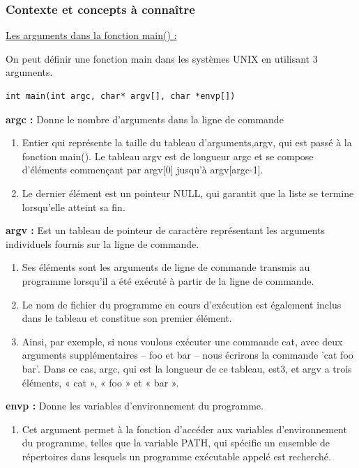\documentclass[12pt,a4paper]{article}
\begin{document}
\begin{flushleft}
            \subsubsection{Contexte et concepts à connaître}
            \underline{Les arguments dans la fonction main() : }
                \item On peut définir une fonction main dans les systèmes UNIX en utilisant 3 arguments.
                \begin{lstlisting}
int main(int argc, char* argv[], char *envp[])
                \end{lstlisting}
                \item \textbf{argc : } Donne le nombre d'arguments dans la ligne de commande
                \begin{enumerate}
                    \item Entier qui représente la taille du tableau d’arguments,argv, qui est passé à la fonction main(). Le tableau argv est de longueur argc et se compose d’éléments commençant par argv[0] jusqu’à argv[argc-1].
                    \item Le dernier élément est un pointeur NULL, qui garantit que la liste se termine lorsqu’elle atteint sa fin.
                \end{enumerate}
                \item \textbf{argv : } Est un tableau de pointeur de caractère représentant les arguments individuels fournis sur la ligne de commande.
                 \begin{enumerate}
                        \item Ses éléments sont les arguments de ligne de commande transmis au programme lorsqu’il a été exécuté à partir de la ligne de commande. 
                        \item Le nom de fichier du programme en cours d’exécution est également inclus dans le tableau et constitue son premier élément.
                        \item Ainsi, par exemple, si nous voulons exécuter une commande cat, avec deux arguments supplémentaires – foo et bar – nous écrirons la commande ’cat foo bar'. Dans ce cas, argc, qui est la longueur de ce tableau, est3, et argv a trois éléments, « cat », « foo » et « bar ».
                \end{enumerate}
                \item \textbf{envp : } Donne les variables d'environnement du programme. 
                \begin{enumerate}
                    \item Cet argument permet à la fonction d’accéder aux variables d’environnement du programme, telles que la variable PATH, qui spécifie un ensemble de répertoires dans lesquels un programme exécutable appelé est recherché.
                \end{enumerate}
                

\end{flushleft}
\end{document}
